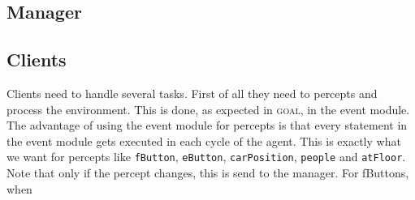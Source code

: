 \documentclass[a4paper,10pt,twocolumn]{article}
\begin{document}
\subsection{Manager}


\subsection{Clients}
Clients need to handle several tasks. First of all they need to percepts and process the environment. This is done, as expected in \textsc{goal}, in the event module. The advantage of using the event module for percepts is that every statement in the event module gets executed in each cycle of the agent. This is exactly what we want for percepts like \texttt{fButton}, \texttt{eButton}, \texttt{carPosition}, \texttt{people} and \texttt{atFloor}. Note that only if the percept changes, this is send to the manager. For fButtons, when 
\end{document}
